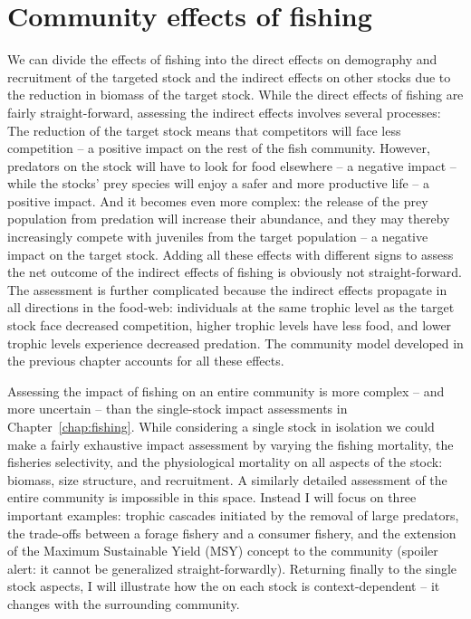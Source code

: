 
\chapter{Community effects of fishing}
\label{chap:communityfishing}
We can divide the effects of fishing into the direct effects on demography and recruitment of the targeted stock and the indirect effects on other stocks due to the reduction in biomass of the target stock.  While the direct effects of fishing are fairly straight-forward, assessing the indirect effects involves several processes:  The reduction of the target stock means that competitors will face less competition -- a positive impact on the rest of the fish community.  However, predators on the stock will have to look for food elsewhere -- a negative impact -- while the stocks' prey species will enjoy a safer and more productive life -- a positive impact.  And it becomes even more complex: the release of the prey population from predation will increase their abundance, and they may thereby increasingly compete with juveniles from the target population -- a negative impact on the target stock.  Adding all these effects with different signs to assess the net outcome of the indirect effects of fishing is obviously not straight-forward.   The assessment is further complicated because the indirect effects propagate in all directions in the food-web: individuals at the same trophic level as the target stock face decreased competition, higher trophic levels have less food, and lower trophic levels experience decreased predation.  The community model developed in the previous chapter accounts for all these effects.

Assessing the impact of fishing on an entire community is more complex -- and more uncertain -- than the single-stock impact assessments in Chapter~\ref{chap:fishing}.  While considering a single stock in isolation we could make a fairly exhaustive impact assessment by varying the fishing mortality, the fisheries selectivity, and the physiological mortality on all aspects of the stock: biomass, size structure, and recruitment.  A similarly detailed assessment of the entire community is impossible  in this space.  Instead I will focus on three important examples: trophic cascades initiated by the removal of large predators, the trade-offs between a forage fishery and a consumer fishery, and the extension of the Maximum Sustainable Yield (MSY) concept to the community (spoiler alert: it cannot be generalized straight-forwardly).  Returning finally to the single stock aspects, I will illustrate how the {\Fmsy} on each stock is context-dependent -- it changes with the surrounding community.



